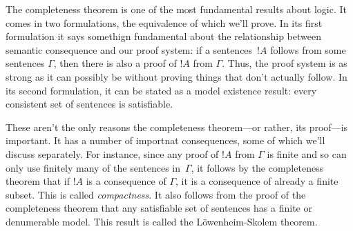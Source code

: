 \documentclass[../../include/open-logic-section]{subfiles}
\begin{document}

The completeness theorem is one of the most fundamental results about
logic.  It comes in two formulations, the equivalence of which we'll
prove. In its first formulation it says somethign fundamental about
the relationship between semantic consequence and our proof system: if
a sentences~$!A$ follows from some sentences $\Gamma$, then there is
also a proof of $!A$ from $\Gamma$.  Thus, the proof system is as
strong as it can possibly be without proving things that don't
actually follow.  In its second formulation, it can be stated as a
model existence result: every consistent set of sentences is
satisfiable.

These aren't the only reasons the completeness theorem---or rather,
its proof---is important. It has a number of importnat consequences,
some of which we'll discuss separately.  For instance, since any proof
of $!A$ from $\Gamma$ is finite and so can only use finitely many of
the sentences in~$\Gamma$, it follows by the completeness theorem that
if $!A$ is a consequence of $\Gamma$, it is a consequence of already a
finite subset.  This is called \emph{compactness}.  It also follows
from the proof of the completeness theorem that any satisfiable set of
sentences has a finite or denumerable model. This result is called the
L\"owenheim-Skolem theorem.
\end{document}
